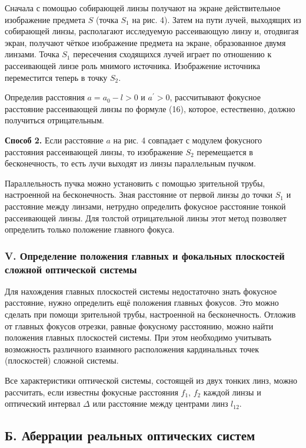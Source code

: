 \documentclass[a4paper,12pt]{article} %
\begin{document}
\hfill \break Сначала с помощью собирающей линзы получают на экране действительное изображение предмета $S$ (точка $S_1$ на рис. 4). Затем на пути лучей, выходящих из собирающей линзы, располагают исследуемую рассеивающую линзу и, отодвигая экран, получают чёткое изображение предмета на экране, образованное двумя линзами. Точка $S_1$ пересечения сходящихся лучей играет по отношению к рассеивающей линзе роль мнимого источника. Изображение источника переместится теперь в точку $S_2$.

\hfill \break Определив расстояния $a = a_0 - l > 0$ и $a^\prime > 0$, рассчитывают фокусное расстояние рассеивающей линзы по формуле (16), которое, естественно, должно получиться отрицательным.

\hfill \break \textbf{Способ 2.} Если расстояние $a$ на рис. 4 совпадает с модулем фокусного расстояния рассеивающей линзы, то изображение $S_2$ перемещается в бесконечность, то есть лучи выходят из линзы параллельным пучком.

\hfill \break Параллельность пучка можно установить с помощью зрительной трубы, настроенной на бесконечность. Зная расстояние от первой линзы до точки $S_1$ и расстояние между линзами, нетрудно определить фокусное расстояние тонкой рассеивающей линзы. Для толстой отрицательной линзы этот метод позволяет определить только положение главного фокуса.

\subsubsection*{V. Определение положения главных и фокальных плоскостей сложной оптической системы}

\hfill \break Для нахождения главных плоскостей системы недостаточно знать фокусное расстояние, нужно определить ещё положения главных фокусов. Это можно сделать при помощи зрительной трубы, настроенной на бесконечность. Отложив от главных фокусов отрезки, равные фокусному расстоянию, можно найти положения главных плоскостей системы. При этом необходимо учитывать возможность различного взаимного расположения кардинальных точек (плоскостей) сложной системы.

\hfill \break Все характеристики оптической системы, состоящей из двух тонких линз, можно рассчитать, если известны фокусные расстояния $f_1$, $f_2$ каждой линзы и оптический интервал $\Delta$ или расстояние между центрами линз $l_{12}$.

\subsection*{Б. Аберрации реальных оптических систем}
	
\end{document}
